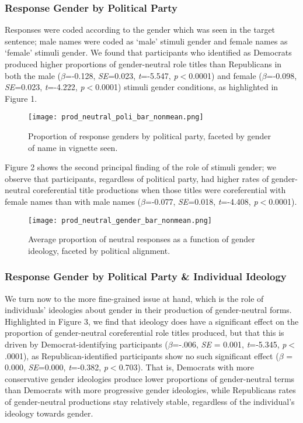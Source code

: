 \subsubsection{Response Gender by Political Party}
Responses were coded according to the gender which was seen in the target sentence; male names were coded as `male' stimuli gender and female names as `female' stimuli gender. We found that participants who identified as Democrats produced higher proportions of gender-neutral role titles than Republicans in both the male ($\beta$=-0.128, \textit{SE}=0.023, \textit{t}=-5.547, \textit{p}$<$0.0001) and female ($\beta$=-0.098, \textit{SE}=0.023, \textit{t}=-4.222, \textit{p}$<$0.0001) stimuli gender conditions, as highlighted in Figure 1.

\begin{figure}[ht!]
	\centering
	\texttt{[image: prod\_neutral\_poli\_bar\_nonmean.png]}
	\caption{Proportion of response genders by political party, faceted by gender of name in vignette seen.}
	\label{prod-box}
\end{figure}

Figure 2 shows the second principal finding of the role of stimuli gender; we observe that participants, regardless of political party, had higher rates of gender-neutral coreferential title productions when those titles were coreferential with female names than with male names  ($\beta$=-0.077, \textit{SE}=0.018, \textit{t}=-4.408, \textit{p}$<$0.0001). 

\begin{figure}[ht!]
	\centering
	\texttt{[image: prod\_neutral\_gender\_bar\_nonmean.png]}
	\caption{Average proportion of neutral responses as a function of gender ideology, faceted by political alignment.}
	\label{prod-neutral-poli-box-gender}
\end{figure}

\subsubsection{Response Gender by Political Party \& Individual Ideology}
We turn now to the more fine-grained issue at hand, which is the role of individuals' ideologies about gender in their production of gender-neutral forms. Highlighted in Figure 3, we find that ideology does have a significant effect on the proportion of gender-neutral coreferential role titles produced, but that this is driven by Democrat-identifying participants ($\beta$=-.006, \textit{SE} = 0.001, \textit{t}=-5.345, \textit{p}$<$.0001), as Republican-identified participants show no such significant effect ($\beta$ = 0.000, \textit{SE}=0.000, \textit{t}=-0.382, \textit{p}$<$0.703). That is, Democrats with more conservative gender ideologies produce lower proportions of gender-neutral terms than Democrats with more progressive gender ideologies, while Republicans rates of gender-neutral productions stay relatively stable, regardless of the individual's ideology towards gender.

